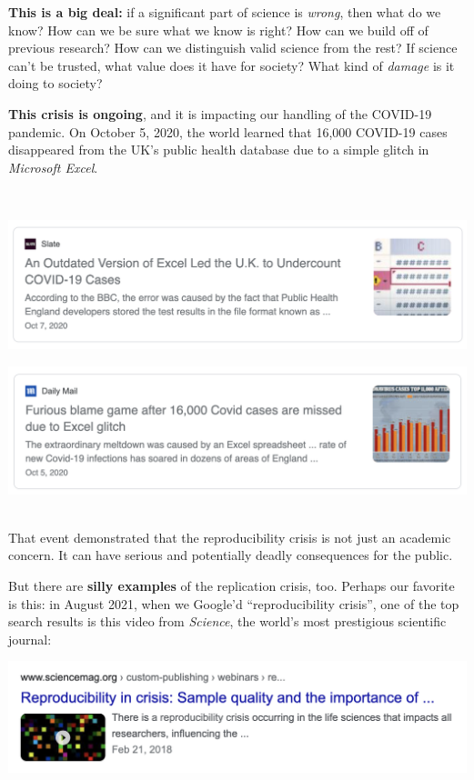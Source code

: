 \documentclass[]{book}
\begin{document}
\textbf{This is a big deal:} if a significant part of science is \emph{wrong}, then what do we know? How can we be sure what we know is right? How can we build off of previous research? How can we distinguish valid science from the rest? If science can't be trusted, what value does it have for society? What kind of \emph{damage} is it doing to society?

\textbf{This crisis is ongoing}, and it is impacting our handling of the COVID-19 pandemic. On October 5, 2020, the world learned that 16,000 COVID-19 cases disappeared from the UK's public health database due to a simple glitch in \emph{Microsoft Excel}.

~

\includegraphics{img/reproducibility-covid-1.png}

\includegraphics{img/reproducibility-covid-2.png}
~

That event demonstrated that the reproducibility crisis is not just an academic concern. It can have serious and potentially deadly consequences for the public.

But there are \textbf{silly examples} of the replication crisis, too. Perhaps our favorite is this: in August 2021, when we Google'd ``reproducibility crisis'', one of the top search results is this video from \emph{Science}, the world's most prestigious scientific journal:

\includegraphics{img/reproducibility-1.png}
\end{document}
